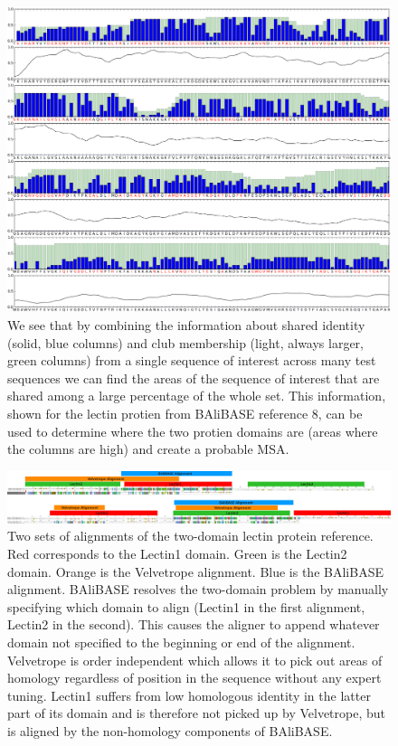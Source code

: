 \documentclass[phd,tocprelim]{cornell}
\begin{document}
 \begin{figure}[htp]%
 \centerline{\includegraphics[width=\textwidth]{figures/velvetrope/COMBO1.png}}
 \caption[Velvetrope per-base output]{We see that by combining the information about shared identity (solid, blue columns) and club membership
(light, always larger, green columns) from a single sequence of interest across many test sequences we can
ﬁnd the areas of the sequence of interest that are shared among a large percentage of the whole set. This
information, shown for the lectin protien from BAliBASE reference 8, can be used to determine where the
two protien domains are (areas where the columns are high) and create a probable MSA.}
 	\label{fig:vr05}
 \end{figure}
 
 \begin{figure}[htp]%
 \centerline{\includegraphics[width=\textwidth]{figures/velvetrope/Alignments.png}}
 \caption[Multiple sequence alignments]{Two sets of alignments of the two-domain lectin protein reference. Red corresponds to the Lectin1 domain. Green is the Lectin2 domain. Orange is the Velvetrope alignment. Blue is the BAliBASE alignment. BAliBASE resolves the two-domain problem by manually specifying which domain to align (Lectin1 in the first alignment, Lectin2 in the second). This causes the aligner to append whatever domain not specified to the beginning or end of the alignment. Velvetrope is order independent which allows it to pick out areas of homology regardless of position in the sequence without any expert tuning. Lectin1 suffers from low homologous identity in the latter part of its domain and is therefore not picked up by Velvetrope, but is aligned by the non-homology components of BAliBASE.}
 	\label{fig:vr05}
 \end{figure}
\end{document}
